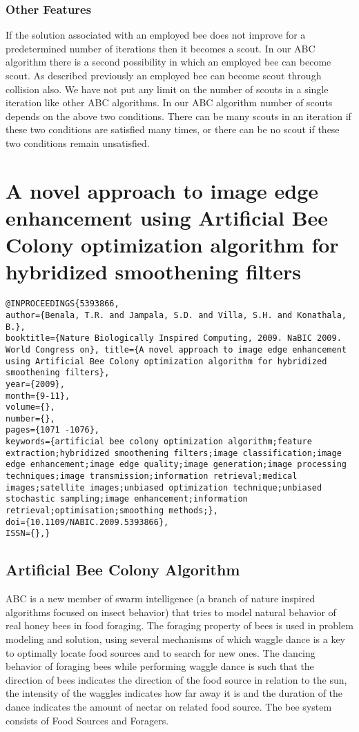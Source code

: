 \documentclass[pdftex,11pt]{article}
\begin{document}
\subsubsection{Other Features}
If the solution associated with an employed bee does not improve for a predetermined number of iterations then it becomes a scout. In our ABC algorithm there is a second possibility in which an employed bee can become scout. As described previously an employed bee can become scout through collision also. We have not put any limit on the number of scouts in a single iteration like other ABC algorithms. In our ABC algorithm number of scouts depends on the above two conditions. There can be many scouts in an iteration if these two conditions are satisfied many times, or there can be no scout if these two conditions remain unsatisfied.

\section{A novel approach to image edge enhancement using Artificial Bee Colony optimization algorithm for hybridized smoothening filters}
\begin{verbatim}
@INPROCEEDINGS{5393866, 
author={Benala, T.R. and Jampala, S.D. and Villa, S.H. and Konathala, B.}, 
booktitle={Nature Biologically Inspired Computing, 2009. NaBIC 2009. World Congress on}, title={A novel approach to image edge enhancement using Artificial Bee Colony optimization algorithm for hybridized smoothening filters}, 
year={2009}, 
month={9-11}, 
volume={}, 
number={}, 
pages={1071 -1076}, 
keywords={artificial bee colony optimization algorithm;feature extraction;hybridized smoothening filters;image classification;image edge enhancement;image edge quality;image generation;image processing techniques;image transmission;information retrieval;medical images;satellite images;unbiased optimization technique;unbiased stochastic sampling;image enhancement;information retrieval;optimisation;smoothing methods;}, 
doi={10.1109/NABIC.2009.5393866}, 
ISSN={},}
\end{verbatim}
\subsection{Artificial Bee Colony Algorithm}
ABC is a new member of swarm intelligence (a branch of nature inspired algorithms focused on insect behavior) that tries to model natural behavior of real honey bees in food foraging. The foraging property of bees is used in problem modeling and solution, using several mechanisms of which waggle dance is a key to optimally locate food sources and to search for new ones. The dancing behavior of foraging bees while performing waggle dance is such that the direction of bees indicates the direction of the food source in relation to the sun, the intensity of the waggles indicates how far away it is and the duration of the dance indicates the amount of nectar on related food source. The bee system consists of Food Sources and Foragers.
\end{document}
